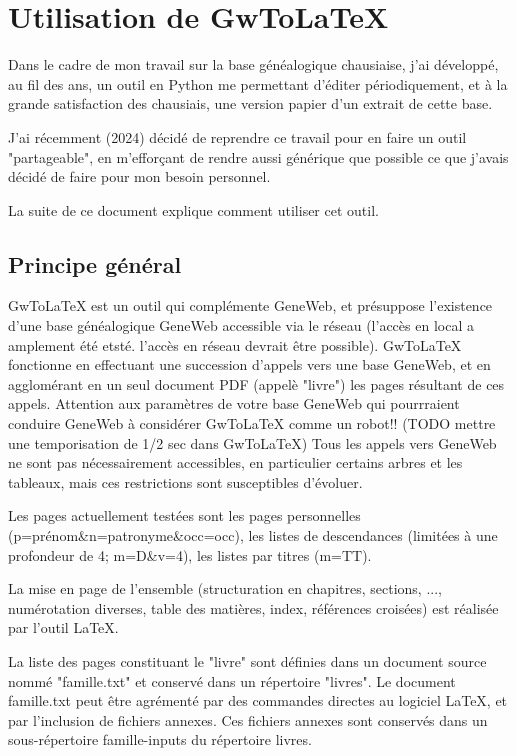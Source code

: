 
\section{Utilisation de GwToLaTeX}

Dans le cadre de mon travail sur la base généalogique chausiaise, j'ai développé,
au fil des ans, un outil en Python me permettant d'éditer périodiquement, et
à la grande satisfaction des chausiais, une version papier d'un extrait de
cette base.

J'ai récemment (2024) décidé de reprendre ce travail pour en faire un outil
"partageable", en m'efforçant de rendre aussi générique que possible ce que j'avais
décidé de faire pour mon besoin personnel.

La suite de ce document explique comment utiliser cet outil.

\subsection{Principe général}

GwToLaTeX est un outil qui complémente GeneWeb, et présuppose l'existence d'une
base généalogique GeneWeb accessible via le réseau (l'accès en local a amplement
été etsté. l'accès en réseau devrait être possible).
GwToLaTeX fonctionne en effectuant une succession d'appels vers une base GeneWeb,
et en agglomérant en un seul document PDF (appelè "livre") les pages résultant
de ces appels. Attention aux paramètres de votre base GeneWeb qui pourrraient
conduire GeneWeb à considérer GwToLaTeX comme un robot!!
(TODO mettre une temporisation de 1/2 sec dans GwToLaTeX)
Tous les appels vers GeneWeb ne sont pas nécessairement accessibles, en
particulier certains arbres et les tableaux, mais ces restrictions sont
susceptibles d'évoluer.

Les pages actuellement testées sont les pages personnelles
(p=prénom\&n=patronyme\&occ=occ), les listes de descendances (limitées à
une profondeur de 4; m=D\&v=4), les listes par titres (m=TT).

La mise en page de l'ensemble (structuration en chapitres, sections, ...,
numérotation diverses, table des matières, index, références croisées)
est réalisée par l'outil LaTeX.

La liste des pages constituant le "livre" sont définies dans un document source
nommé "famille.txt" et conservé dans un répertoire "livres".
Le document famille.txt peut être agrémenté par des commandes directes au
logiciel LaTeX, et par l'inclusion de fichiers annexes. Ces fichiers annexes
sont conservés dans un sous-répertoire famille-inputs du répertoire livres.

